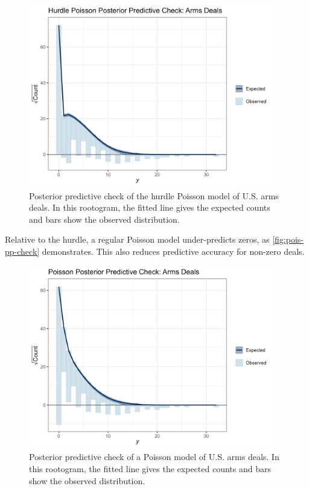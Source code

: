 \documentclass[12pt]{article}
\begin{document}
\begin{figure}[htpb]
	\centering
		\includegraphics[width=0.95\textwidth]{pp-check-deals.png}
	\caption{Posterior predictive check of the hurdle Poisson model of U.S. arms deals. In this rootogram, the fitted line gives the expected counts and bars show the observed distribution.}
	\label{fig:pp-check-deals}
\end{figure}


Relative to the hurdle, a regular Poisson model under-predicts zeros, as \autoref{fig:pois-pp-check} demonstrates. 
This also reduces predictive accuracy for non-zero deals. 


\begin{figure}[htpb]
	\centering
		\includegraphics[width=0.95\textwidth]{pois-pp-check.png}
	\caption{Posterior predictive check of a Poisson model of U.S. arms deals. In this rootogram, the fitted line gives the expected counts and bars show the observed distribution.}
	\label{fig:pois-pp-check}
\end{figure}
\end{document}
